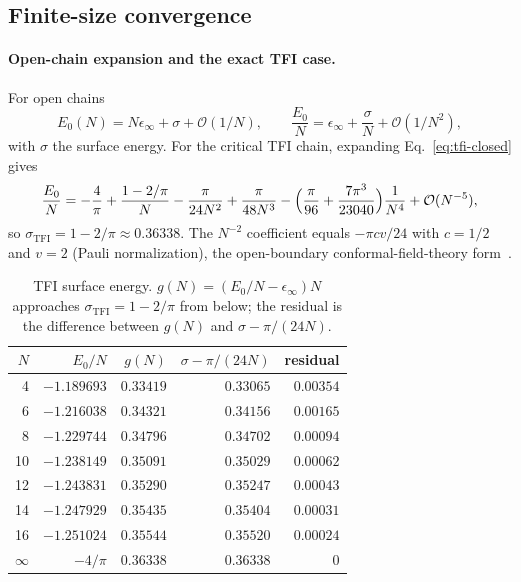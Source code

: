\documentclass[pdflatex,sn-mathphys-num]{sn-jnl}
\begin{document}
\subsection{Finite-size convergence}
\label{sec:convergence}

\paragraph{Open-chain expansion and the exact TFI case.}
For open chains
\begin{equation}
E_0(N) = N\epsilon_\infty + \sigma + \mathcal{O}(1/N),\qquad
\frac{E_0}{N} = \epsilon_\infty + \frac{\sigma}{N} + \mathcal{O}(1/N^2),
\label{eq:obc-expansion}
\end{equation}
with $\sigma$ the surface energy. For the critical TFI chain,
expanding Eq.~\eqref{eq:tfi-closed} gives
\begin{equation}
\frac{E_0}{N} = -\frac4\pi + \frac{1-2/\pi}{N} - \frac{\pi}{24N^2}
  + \frac{\pi}{48N^3}
  - \Bigl(\frac{\pi}{96} + \frac{7\pi^3}{23040}\Bigr)\frac{1}{N^4}
  + \mathcal{O}(N^{-5}),
\label{eq:tfi-expansion}
\end{equation}
so $\sigma_{\mathrm{TFI}} = 1-2/\pi \approx 0.36338$. The $N^{-2}$
coefficient equals $-\pi c v/24$ with $c=1/2$ and $v=2$ (Pauli
normalization), the open-boundary conformal-field-theory
form~\cite{Cardy1984}.

\begin{table}[t]
\centering
\small
\caption{TFI surface energy. $g(N) = (E_0/N-\epsilon_\infty) N$
approaches $\sigma_{\mathrm{TFI}} = 1-2/\pi$ from below; the residual
is the difference between $g(N)$ and $\sigma-\pi/(24N)$.}
\label{tab:surface}
\begin{tabular}{rrrrr}
\toprule
$N$ & $E_0/N$ & $g(N)$ & $\sigma - \pi/(24N)$ & residual \\
\midrule
4  & $-1.189693$ & $0.33419$ & $0.33065$ & $0.00354$ \\
6  & $-1.216038$ & $0.34321$ & $0.34156$ & $0.00165$ \\
8  & $-1.229744$ & $0.34796$ & $0.34702$ & $0.00094$ \\
10 & $-1.238149$ & $0.35091$ & $0.35029$ & $0.00062$ \\
12 & $-1.243831$ & $0.35290$ & $0.35247$ & $0.00043$ \\
14 & $-1.247929$ & $0.35435$ & $0.35404$ & $0.00031$ \\
16 & $-1.251024$ & $0.35544$ & $0.35520$ & $0.00024$ \\
$\infty$ & $-4/\pi$ & $0.36338$ & $0.36338$ & $0$ \\
\bottomrule
\end{tabular}
\end{table}
\end{document}
